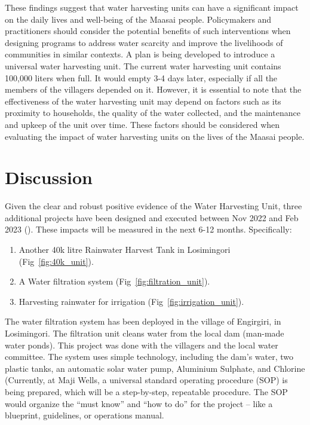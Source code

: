 \documentclass[10pt, twocolumn]{article}
\begin{document}
These findings suggest that water harvesting units can have a significant impact on the daily lives and well-being of the Maasai people. Policymakers and practitioners should consider the potential benefits of such interventions when designing programs to address water scarcity and improve the livelihoods of communities in similar contexts. A plan is being developed to introduce a universal water harvesting unit. The current water harvesting unit contains 100,000 liters when full. It would empty 3-4 days later, especially if all the members of the villagers depended on it. However, it is essential to note that the effectiveness of the water harvesting unit may depend on factors such as its proximity to households, the quality of the water collected, and the maintenance and upkeep of the unit over time. These factors should be considered when evaluating the impact of water harvesting units on the lives of the Maasai people.

\section{Discussion}

Given the clear and robust positive evidence of the Water Harvesting Unit, three additional projects have been designed and executed between Nov 2022 and Feb 2023 (\autocite{Karimu}). These impacts will be measured in the next 6-12 months. Specifically:

\begin{enumerate}
    \item Another 40k litre Rainwater Harvest Tank in Losimingori (Fig~\ref{fig:40k_unit}).
    \item A Water filtration system (Fig~\ref{fig:filtration_unit}).
    \item Harvesting rainwater for irrigation (Fig~\ref{fig:irrigation_unit}).
\end{enumerate}

The water filtration system has been deployed in the village of Engirgiri, in Losimingori. The filtration unit cleans water from the local dam (man-made water ponds). This project was done with the villagers and the local water committee. The system uses simple technology, including the dam's water, two plastic tanks, an automatic solar water pump, Aluminium Sulphate, and Chlorine (Currently, at Maji Wells, a universal standard operating procedure (SOP) is being prepared, which will be a step-by-step, repeatable procedure. The SOP would organize the “must know” and “how to do” for the project – like a blueprint, guidelines, or operations manual.
\end{document}
